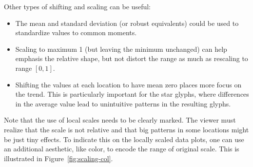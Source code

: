 \documentclass[oneside]{article}
\begin{document}
Other types of shifting and scaling can be useful:

\begin{itemize} \itemsep 0in

  \item The mean and standard deviation (or robust equivalents) could be used
  to standardize values to common moments.
  
   \item Scaling to maximum 1 (but leaving the minimum unchanged) can help
  emphasis the relative shape, but not distort the range as much as rescaling
  to range $[0, 1]$.

  \item Shifting the values at each location to have mean zero places more
  focus on the trend. This is particularly important for the star glyphs,
  where differences in the average value lead to unintuitive patterns in the
  resulting glyphs.

\end{itemize}

Note that the use of local scales needs to be clearly marked. The viewer must realize that the scale is not relative and that big patterns in some locations might be just tiny effects. To indicate this on the locally scaled data plots, one can use an additional aesthetic, like color, to encode the range of original scale. This is illustrated in Figure~\ref{fig:scaling-col}.
\end{document}
